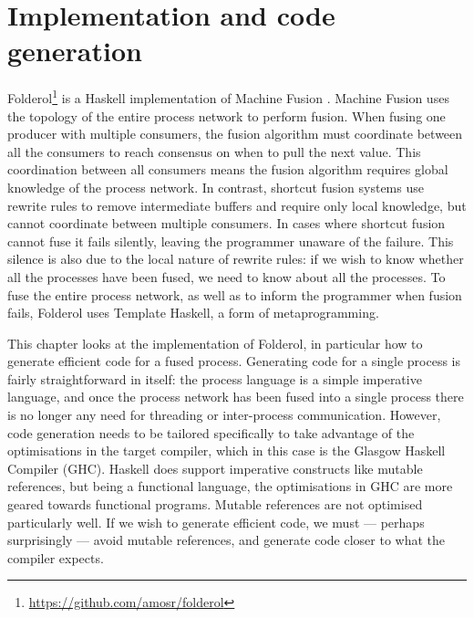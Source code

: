 \chapter{Implementation and code generation}
\label{chapter:process:implementation}

Folderol\footnote{\url{https://github.com/amosr/folderol}} is a Haskell implementation of Machine Fusion .
Machine Fusion uses the topology of the entire process network to perform fusion.
When fusing one producer with multiple consumers, the fusion algorithm must coordinate between all the consumers to reach consensus on when to pull the next value.
This coordination between all consumers means the fusion algorithm requires global knowledge of the process network.
In contrast, shortcut fusion systems  use rewrite rules to remove intermediate buffers and require only local knowledge, but cannot coordinate between multiple consumers.
In cases where shortcut fusion cannot fuse it fails silently, leaving the programmer unaware of the failure.
This silence is also due to the local nature of rewrite rules: if we wish to know whether all the processes have been fused, we need to know about all the processes.
To fuse the entire process network, as well as to inform the programmer when fusion fails, Folderol uses Template Haskell, a form of metaprogramming.

This chapter looks at the implementation of Folderol, in particular how to generate efficient code for a fused process.
Generating code for a single process is fairly straightforward in itself: the process language is a simple imperative language, and once the process network has been fused into a single process there is no longer any need for threading or inter-process communication.
However, code generation needs to be tailored specifically to take advantage of the optimisations in the target compiler, which in this case is the Glasgow Haskell Compiler (GHC).
Haskell does support imperative constructs like mutable references, but being a functional language, the optimisations in GHC are more geared towards functional programs.
Mutable references are not optimised particularly well.
If we wish to generate efficient code, we must --- perhaps surprisingly --- avoid mutable references, and generate code closer to what the compiler expects.

